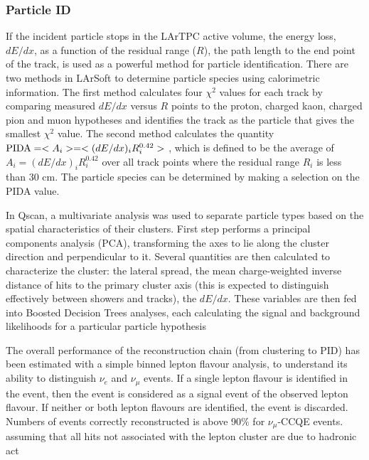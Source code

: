 
\subsubsection{Particle ID}


If the incident particle stops in the LArTPC active volume, the energy
loss, $dE/dx$, as a function of the residual range ($R$), the path
length to the end point of the track, is used as a powerful method for
particle identification. There are two methods in LArSoft to determine
particle species using calorimetric information. The first method
calculates four $\chi^{2}$ values for each track by comparing measured
$dE/dx$ versus $R$ points to the proton, charged kaon, charged pion
and muon hypotheses and identifies the track as the particle that
gives the smallest $\chi^{2}$ value. The second method calculates the
quantity ${\rm{PIDA}} = <A_{i}> = <(dE/dx)_{i}R_{i}^{0.42}>$ \cite{box},
which is defined to be the average of $A_{i} =
(dE/dx)_{i}R_{i}^{0.42}$ over all track points where the residual
range $R_{i}$ is less than 30 cm. The particle species can be
determined by making a selection on the PIDA value.


In Qscan, a multivariate analysis was used to separate particle types based on the spatial characteristics of their clusters.
First step performs a principal components analysis (PCA), transforming the axes to lie along the 
cluster direction and perpendicular to it. Several quantities are then calculated to 
characterize the cluster: the lateral spread, the mean charge-weighted inverse distance of hits to the primary cluster axis
(this is expected to distinguish effectively between showers and tracks), the $dE/dx$.
These variables are then fed into Boosted Decision Trees analyses, 
each calculating the signal and background likelihoods for a particular particle hypothesis

The overall performance of the reconstruction chain (from clustering to PID) has been estimated with a simple binned lepton flavour analysis, 
to understand its ability to distinguish $\nu_{e}$ and $\nu_{\mu}$ events.
If a single lepton flavour is identified in the event, then the event is considered as a signal event of the observed lepton flavour. 
If neither or both lepton flavours are identified, the event is discarded.
Numbers of events correctly reconstructed is above 90$\%$ for $\nu_{\mu}$-CCQE events.
assuming that all hits not associated with the lepton cluster are due to hadronic act%

